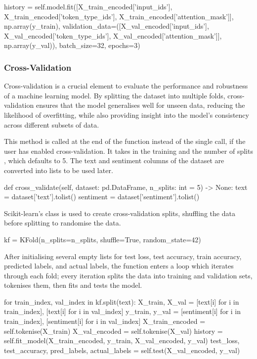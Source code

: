         \begin{python}
history = self.model.fit([X_train_encoded['input_ids'], X_train_encoded['token_type_ids'], X_train_encoded['attention_mask']], np.array(y_train), validation_data=([X_val_encoded['input_ids'], X_val_encoded['token_type_ids'], X_val_encoded['attention_mask']], np.array(y_val)), batch_size=32, epochs=3)
        \end{python}

        \subsubsection{Cross-Validation}
        Cross-validation is a crucial element to evaluate the performance and robustness of a machine learning model. By splitting the dataset into multiple folds, cross-validation ensures that the model generalises well for unseen data, reducing the likelihood of overfitting, while also providing insight into the model's consistency across different subsets of data.

        This method is called at the end of the  function instead of the single  call, if the user has enabled cross-validation. It takes in the training  and the number of splits , which defaults to 5. The text and sentiment columns of the dataset are converted into lists to be used later.

        \begin{python}
def cross_validate(self, dataset: pd.DataFrame, n_splits: int = 5) -> None:
    text = dataset['text'].tolist()
    sentiment = dataset['sentiment'].tolist()
        \end{python}

        Scikit-learn's  class is used to create cross-validation splits, shuffling the data before splitting to randomise the data.

        \begin{python}
kf = KFold(n_splits=n_splits, shuffle=True, random_state=42)
        \end{python}

        After initialising several empty lists for test loss, test accuracy, train accuracy, predicted labels, and actual labels, the function enters a loop which iterates through each fold; every iteration splits the data into training and validation sets, tokenises them, then fits and tests the model.

        \begin{python}
for train_index, val_index in kf.split(text):
    X_train, X_val = [text[i] for i in train_index], [text[i] for i in val_index]
    y_train, y_val = [sentiment[i] for i in train_index], [sentiment[i] for i in val_index]
    X_train_encoded = self.tokenise(X_train)
    X_val_encoded = self.tokenise(X_val)
    history = self.fit_model(X_train_encoded, y_train, X_val_encoded, y_val)
    test_loss, test_accuracy, pred_labels, actual_labels = self.test(X_val_encoded, y_val)
        \end{python}

